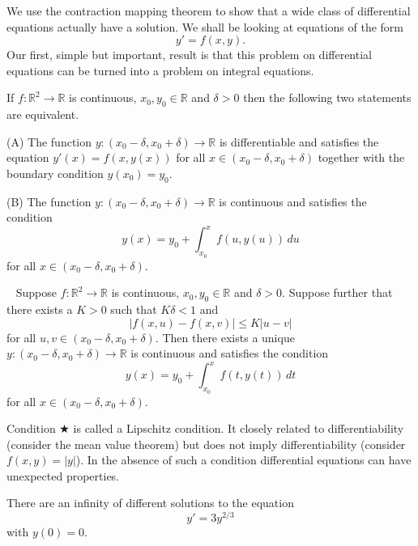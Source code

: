 We use the contraction mapping theorem to show
that a wide class of differential equations
actually have a solution. We shall be looking
at equations of the form
\[y'=f(x,y).\]
Our first, simple but important, result is that
this problem on differential equations can be turned into
a problem on integral equations.
\begin{lemma} If $f:{\mathbb R}^{2}\rightarrow{\mathbb R}$
is continuous, $x_{0},y_{0}\in{\mathbb R}$ and $\delta>0$
then the following two statements
are equivalent.

(A) The function 
$y:(x_{0}-\delta,x_{0}+\delta)\rightarrow{\mathbb R}$
is differentiable and satisfies the equation $y'(x)=f(x,y(x))$
for all $x\in (x_{0}-\delta,x_{0}+\delta)$ together
with the boundary condition $y(x_{0})=y_{0}$.

(B) The function 
$y:(x_{0}-\delta,x_{0}+\delta)\rightarrow{\mathbb R}$
is continuous and satisfies the condition
\[y(x)=y_{0}+\int_{x_{0}}^{x}f(u,y(u))\,du\]
for all $x\in (x_{0}-\delta,x_{0}+\delta)$.
\end{lemma}

\begin{theorem}~\label{integral solution}
Suppose $f:{\mathbb R}^{2}\rightarrow{\mathbb R}$
is continuous, $x_{0},y_{0}\in{\mathbb R}$ and $\delta>0$.
Suppose further that there exists a $K>0$ such that
$K\delta<1$ and
\begin{equation*}
|f(x,u)-f(x,v)|\leq K|u-v| \tag*{$\bigstar$}
\end{equation*}
for all $u,v\in (x_{0}-\delta,x_{0}+\delta)$.
Then there exists a unique
$y:(x_{0}-\delta,x_{0}+\delta)\rightarrow{\mathbb R}$
is continuous and satisfies the condition
\[y(x)=y_{0}+\int_{x_{0}}^{x}f(t,y(t))\,dt\]
for all $x\in (x_{0}-\delta,x_{0}+\delta)$.
\end{theorem}
Condition $\bigstar$ is called a Lipschitz condition.
It closely related to differentiability (consider
the mean value theorem) but does not imply differentiability
(consider $f(x,y)=|y|$). In the absence of such
a condition differential equations can have unexpected
properties.
\begin{example} There are an infinity of different
solutions to the equation
\[y'=3y^{2/3}\]
with $y(0)=0$.
\end{example}

